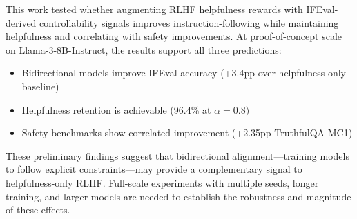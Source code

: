 
This work tested whether augmenting RLHF helpfulness rewards with IFEval-derived controllability signals improves instruction-following while maintaining helpfulness and correlating with safety improvements. At proof-of-concept scale on Llama-3-8B-Instruct, the results support all three predictions:

\begin{itemize}
\item Bidirectional models improve IFEval accuracy (+3.4pp over helpfulness-only baseline)
\item Helpfulness retention is achievable (96.4\% at $\alpha =0.8)$
\item Safety benchmarks show correlated improvement (+2.35pp TruthfulQA MC1)
\end{itemize}

These preliminary findings suggest that bidirectional alignment---training models to follow explicit constraints---may provide a complementary signal to helpfulness-only RLHF. Full-scale experiments with multiple seeds, longer training, and larger models are needed to establish the robustness and magnitude of these effects.
